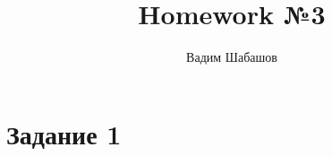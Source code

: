 \documentclass{article}
\title{Homework №3}
\author{Вадим Шабашов}
\date{}
\begin{document}
	
	\maketitle
	
	\section*{Задание 1}

\begin{figure}[H]
	\end{figure}

\begin{figure}[H]
\end{figure}
\end{document}
